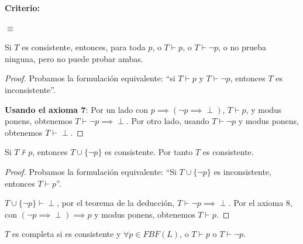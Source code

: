 \noindent\textbf{Criterio: }\mbox{}

	 $\equiv$


\begin{theorem}
	Si $T$ es consistente, entonces, para toda $p$, o $T\vdash p$, o $T\vdash \neg p$, o no prueba ninguna, pero no puede probar ambas.
\end{theorem}
\begin{proof}\mbox{}

	Probamos la formulación equivalente: ``si $T\vdash p$ y $T\vdash \neg p$, entonces $T$ es inconsistente''.

	\textbf{Usando el axioma 7}:
	Por un lado con $p\implies(\neg p \implies \perp)$, $T\vdash p$, y modus ponens, obtenemos $T\vdash \neg p \implies \perp$. Por otro lado, usando $T\vdash \neg p$ y modus ponens, obtenemos $T\vdash\perp$.
\end{proof}

\begin{theorem}
	Si $T \nvdash p$, entonces $T\cup \{\neg p\}$ es consistente. Por tanto $T$ es consistente.
	\label{thm:pconsnegp}
\end{theorem}
\begin{proof}\mbox{}

	Probamos la formulación equivalente:  ``Si $T\cup \{\neg p\}$ es inconsistente, entonces $T\vdash p$''.

	$T\cup \{\neg p\}\vdash \perp$, por el teorema de la deducción, $T\vdash \neg p\implies \perp$. Por el axioma 8, con $(\neg p \implies \perp)\implies p$ y modus ponens, obtenemos $T\vdash p$.
\end{proof}

\begin{defn}
	$T$ es completa si es consistente y $\forall p\in FBF(L)$, o $T\vdash p$ o $T\vdash \neg p$.
\end{defn}

